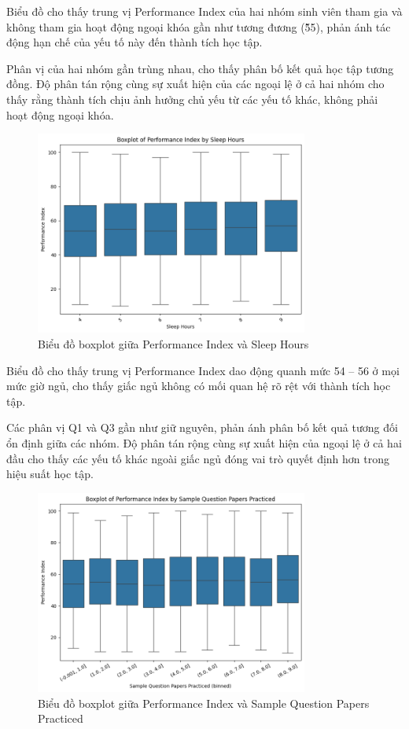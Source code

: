 Biểu đồ cho thấy trung vị Performance Index của hai nhóm sinh viên tham gia và không tham gia hoạt động ngoại khóa gần như tương đương (\~55), phản ánh tác động hạn chế của yếu tố này đến thành tích học tập.

Phân vị của hai nhóm gần trùng nhau, cho thấy phân bố kết quả học tập tương đồng. Độ phân tán rộng cùng sự xuất hiện của các ngoại lệ ở cả hai nhóm cho thấy rằng thành tích chịu ảnh hưởng chủ yếu từ các yếu tố khác, không phải hoạt động ngoại khóa.

\begin{figure}[H]
	\centering
	\includegraphics[width=0.8\textwidth]{images/eda/6.png}
	\caption{Biểu đồ boxplot giữa Performance Index và Sleep Hours}
\end{figure}

Biểu đồ cho thấy trung vị Performance Index dao động quanh mức 54 – 56 ở mọi mức giờ ngủ, cho thấy giấc ngủ không có mối quan hệ rõ rệt với thành tích học tập.

Các phân vị Q1 và Q3 gần như giữ nguyên, phản ánh phân bố kết quả tương đối ổn định giữa các nhóm. Độ phân tán rộng cùng sự xuất hiện của ngoại lệ ở cả hai đầu cho thấy các yếu tố khác ngoài giấc ngủ đóng vai trò quyết định hơn trong hiệu suất học tập.

\begin{figure}[H]
	\centering
	\includegraphics[width=0.8\textwidth]{images/eda/7.png}
	\caption{Biểu đồ boxplot giữa Performance Index và Sample Question Papers Practiced}
\end{figure}

